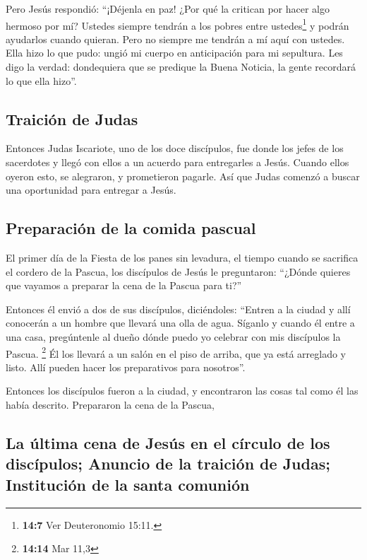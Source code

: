 Pero Jesús respondió: ``¡Déjenla en paz! ¿Por qué la
critican por hacer algo hermoso por mí?  Ustedes siempre
tendrán a los pobres entre ustedes\footnote{\textbf{14:7} Ver
  Deuteronomio 15:11.} y podrán ayudarlos cuando quieran. Pero no
siempre me tendrán a mí aquí con ustedes.  Ella hizo lo
que pudo: ungió mi cuerpo en anticipación para mi sepultura.
 Les digo la verdad: dondequiera que se predique la Buena
Noticia, la gente recordará lo que ella hizo''.

\hypertarget{traiciuxf3n-de-judas}{%
\subsection{Traición de Judas}\label{traiciuxf3n-de-judas}}

 Entonces Judas Iscariote, uno de los doce discípulos,
fue donde los jefes de los sacerdotes y llegó con ellos a un acuerdo
para entregarles a Jesús.  Cuando ellos oyeron esto, se
alegraron, y prometieron pagarle. Así que Judas comenzó a buscar una
oportunidad para entregar a Jesús.

\hypertarget{preparaciuxf3n-de-la-comida-pascual}{%
\subsection{Preparación de la comida
pascual}\label{preparaciuxf3n-de-la-comida-pascual}}

 El primer día de la Fiesta de los panes sin levadura, el
tiempo cuando se sacrifica el cordero de la Pascua, los discípulos de
Jesús le preguntaron: ``¿Dónde quieres que vayamos a preparar la cena de
la Pascua para ti?''

 Entonces él envió a dos de sus discípulos, diciéndoles:
``Entren a la ciudad y allí conocerán a un hombre que llevará una olla
de agua. Síganlo  y cuando él entre a una casa,
pregúntenle al dueño dónde puedo yo celebrar con mis discípulos la
Pascua. \footnote{\textbf{14:14} Mar 11,3}  Él los
llevará a un salón en el piso de arriba, que ya está arreglado y listo.
Allí pueden hacer los preparativos para nosotros''.

 Entonces los discípulos fueron a la ciudad, y
encontraron las cosas tal como él las había descrito. Prepararon la cena
de la Pascua,

\hypertarget{la-uxfaltima-cena-de-jesuxfas-en-el-cuxedrculo-de-los-discuxedpulos-anuncio-de-la-traiciuxf3n-de-judas-instituciuxf3n-de-la-santa-comuniuxf3n}{%
\subsection{La última cena de Jesús en el círculo de los discípulos;
Anuncio de la traición de Judas; Institución de la santa
comunión}\label{la-uxfaltima-cena-de-jesuxfas-en-el-cuxedrculo-de-los-discuxedpulos-anuncio-de-la-traiciuxf3n-de-judas-instituciuxf3n-de-la-santa-comuniuxf3n}}

